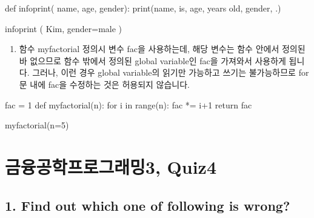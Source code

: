 \documentclass[
  a4paper,
  DIV=11,
  numbers=noendperiod]{scrreprt}
\newenvironment{Shaded}{\begin{snugshade}}{\end{snugshade}}
\newcommand{\BuiltInTok}[1]{\textcolor[rgb]{0.00,0.23,0.31}{#1}}
\newcommand{\ControlFlowTok}[1]{\textcolor[rgb]{0.00,0.23,0.31}{#1}}
\newcommand{\DecValTok}[1]{\textcolor[rgb]{0.68,0.00,0.00}{#1}}
\newcommand{\KeywordTok}[1]{\textcolor[rgb]{0.00,0.23,0.31}{#1}}
\newcommand{\NormalTok}[1]{\textcolor[rgb]{0.00,0.23,0.31}{#1}}
\newcommand{\OperatorTok}[1]{\textcolor[rgb]{0.37,0.37,0.37}{#1}}
\newcommand{\StringTok}[1]{\textcolor[rgb]{0.13,0.47,0.30}{#1}}
\providecommand{\tightlist}{%
  \setlength{\itemsep}{0pt}\setlength{\parskip}{0pt}}\usepackage{longtable,booktabs,array}
\begin{document}
\begin{Shaded}
\begin{Highlighting}[]
\KeywordTok{def}\NormalTok{ infoprint( name, age, gender):}
    \BuiltInTok{print}\NormalTok{(name, }\StringTok{\textquotesingle{}is\textquotesingle{}}\NormalTok{, age, }\StringTok{\textquotesingle{}years old\textquotesingle{}}\NormalTok{, gender, }\StringTok{\textquotesingle{}.\textquotesingle{}}\NormalTok{)}

\NormalTok{infoprint ( }\StringTok{\textquotesingle{}Kim\textquotesingle{}}\NormalTok{, gender}\OperatorTok{=}\StringTok{\textquotesingle{}male\textquotesingle{}}\NormalTok{ )}
\end{Highlighting}
\end{Shaded}

\begin{enumerate}
\def\labelenumi{(\arabic{enumi})}
\setcounter{enumi}{2}
\tightlist
\item
  함수 myfactorial 정의시 변수 fac을 사용하는데, 해당 변수는 함수 안에서
  정의된바 없으므로 함수 밖에서 정의된 global variable인 fac을 가져와서
  사용하게 됩니다. 그러나, 이런 경우 global variable의 읽기만 가능하고
  쓰기는 불가능하므로 for문 내에 fac을 수정하는 것은 허용되지 않습니다.
\end{enumerate}

\begin{Shaded}
\begin{Highlighting}[]
\NormalTok{fac }\OperatorTok{=} \DecValTok{1}
\KeywordTok{def}\NormalTok{ myfactorial(n):}
    \ControlFlowTok{for}\NormalTok{ i }\KeywordTok{in} \BuiltInTok{range}\NormalTok{(n):}
\NormalTok{         fac }\OperatorTok{*=}\NormalTok{ i}\OperatorTok{+}\DecValTok{1}
    \ControlFlowTok{return}\NormalTok{ fac}

\NormalTok{myfactorial(n}\OperatorTok{=}\DecValTok{5}\NormalTok{)}
\end{Highlighting}
\end{Shaded}

\chapter*{금융공학프로그래밍3,
Quiz4}\label{uxae08uxc735uxacf5uxd559uxd504uxb85cuxadf8uxb798uxbc0d3-quiz4}


\section*{1. Find out which one of following is
wrong?}\label{find-out-which-one-of-following-is-wrong}
\end{document}
